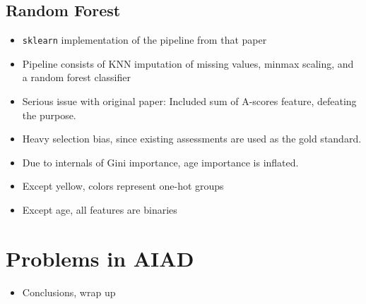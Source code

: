 \documentclass[twoside, letterpaper, twocolumn]{article}
\begin{document}
\subsection{Random Forest}
\begin{itemize}
    \item \texttt{sklearn} implementation of the pipeline from that paper
    \item Pipeline consists of KNN imputation of missing values, minmax scaling, and a random forest classifier
    \item Serious issue with original paper: Included sum of A-scores feature, defeating the purpose.
    \item Heavy selection bias, since existing assessments are used as the gold standard.
    \item Due to internals of Gini importance, age importance is inflated.
    \item Except yellow, colors represent one-hot groups
    \item Except age, all features are binaries
\end{itemize}
\section{Problems in AIAD}
\begin{itemize}
    \item Conclusions, wrap up
\end{itemize}
\end{document}
